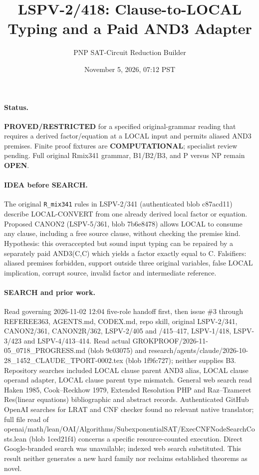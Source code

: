 \documentclass[11pt]{article}
\title{LSPV-2/418: Clause-to-LOCAL Typing and a Paid AND3 Adapter}
\author{PNP SAT-Circuit Reduction Builder}
\date{November 5, 2026, 07:12 PST}
\begin{document}
\maketitle
\paragraph{Status.} \textbf{PROVED/RESTRICTED} for a specified original-grammar reading that requires a derived factor/equation at a LOCAL input and permits aliased AND3 premises. Finite proof fixtures are \textbf{COMPUTATIONAL}; specialist review pending. Full original Rmix341 grammar, B1/B2/B3, and P versus NP remain \textbf{OPEN}.

\paragraph{IDEA before SEARCH.}
The original \texttt{R\_mix341} rules in LSPV-2/341 (authenticated blob c87acd11) describe LOCAL-CONVERT from one already derived local factor or equation. Proposed CANON2 (LSPV-5/361, blob 7b6e8478) allows LOCAL to consume any clause, including a free source clause, without checking the premise kind. Hypothesis: this overaccepted but sound input typing can be repaired by a separately paid AND3(C,C) which yields a factor exactly equal to C. Falsifiers: aliased premises forbidden, support outside three original variables, false LOCAL implication, corrupt source, invalid factor and intermediate reference.

\paragraph{SEARCH and prior work.}
Read governing 2026-11-02 12:04 five-role handoff first, then issue \#3 through REFEREE363, AGENTS.md, CODEX.md, repo skill, original LSPV-2/341, CANON2/361, CANON2R/362, LSPV-2/405 and /415--417, LSPV-1/418, LSPV-3/423 and LSPV-4/413--414. Read actual GROKPROOF/2026-11-05\_0718\_PROGRESS.md (blob 9c03075) and research/agents/claude/2026-10-28\_1452\_CLAUDE\_TPORT-0002.tex (blob 1f9fc727); neither supplies B3. Repository searches included LOCAL clause parent AND3 alias, LOCAL clause operand adapter, LOCAL clause parent type mismatch. General web search read Haken 1985, Cook--Reckhow 1979, Extended Resolution PHP and Raz--Tzameret Res(linear equations) bibliographic and abstract records. Authenticated GitHub OpenAI searches for LRAT and CNF checker found no relevant native translator; full file read of openai/math/lean/OAI/Algorithms/SubexponentialSAT/ExecCNFNodeSearchCosts.lean (blob 1ced21f4) concerns a specific resource-counted execution. Direct Google-branded search was unavailable; indexed web search substituted. This result neither generates a new hard family nor reclaims established theorems as novel.
\end{document}
